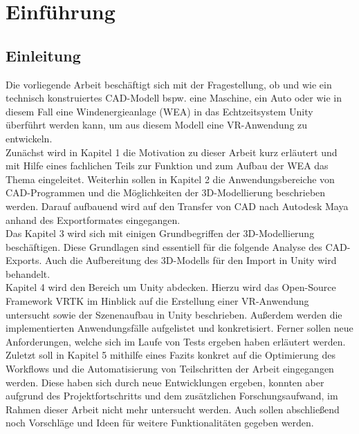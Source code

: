 \chapter{Einführung}
\section{Einleitung}
\label{sec:Einleitung}
Die vorliegende Arbeit beschäftigt sich mit der Fragestellung, ob und wie ein technisch konstruiertes CAD-Modell bspw. eine Maschine, ein Auto oder wie in diesem Fall eine Windenergieanlage (WEA) in das Echtzeitsystem Unity überführt werden kann, um aus diesem Modell eine VR-Anwendung zu entwickeln.\\
Zunächst wird in Kapitel 1 die Motivation zu dieser Arbeit kurz erläutert und mit Hilfe eines fachlichen Teils zur Funktion und zum Aufbau der WEA das Thema eingeleitet. 
Weiterhin sollen in Kapitel 2 die Anwendungsbereiche von CAD-Programmen und die Möglichkeiten der 3D-Modellierung beschrieben werden. Darauf aufbauend wird auf den Transfer von CAD nach Autodesk Maya anhand des Exportformates eingegangen.\\
Das Kapitel 3 wird sich mit einigen Grundbegriffen der 3D-Modellierung beschäftigen. Diese Grundlagen sind essentiell für die folgende Analyse des CAD-Exports. Auch die Aufbereitung des 3D-Modells für den Import in Unity wird behandelt.\\
Kapitel 4 wird den Bereich um Unity abdecken. Hierzu wird das Open-Source Framework VRTK im Hinblick auf die Erstellung einer VR-Anwendung untersucht sowie der Szenenaufbau in Unity beschrieben. Außerdem werden die implementierten Anwendungsfälle aufgelistet und konkretisiert. Ferner sollen neue Anforderungen, welche sich im Laufe von Tests ergeben haben erläutert werden.\\ 
Zuletzt soll in Kapitel 5 mithilfe eines Fazits konkret auf die Optimierung des Workflows und die Automatisierung von Teilschritten der Arbeit eingegangen werden. Diese haben sich durch neue Entwicklungen ergeben, konnten aber aufgrund des Projektfortschritts und dem zusätzlichen Forschungsaufwand, im Rahmen dieser Arbeit  nicht mehr untersucht werden. Auch sollen abschließend noch Vorschläge und Ideen für weitere Funktionalitäten gegeben werden.


